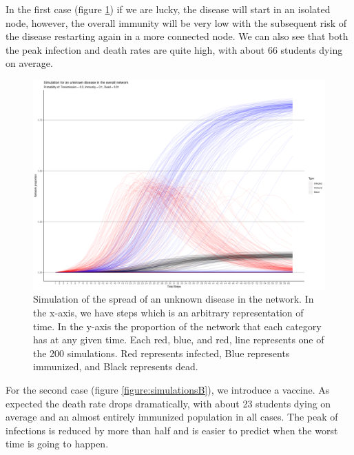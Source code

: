 \begin{table}[H]
    \label{table:networkSimulations}
    
\end{table}

In the first case (figure \ref{figure:simulationsA}) if we are lucky, the disease will start in an isolated node, however, the overall immunity will be very low with the subsequent risk of the disease restarting again in a more connected node. We can also see that both the peak infection and death rates are quite high, with about 66 students dying on average.

    \begin{figure}[h!]
        \centering
            \includegraphics[width=0.95\linewidth]{figures/Networks/Simulations/Simulation_Nothing.png} 
        \caption{Simulation of the spread of an unknown disease in the network. In the x-axis, we have steps which is an arbitrary representation of time. In the y-axis the proportion of the network that each category has at any given time. Each red, blue, and red, line represents one of the 200 simulations. Red represents infected, Blue represents immunized, and Black represents dead.}
        \label{figure:simulationsA}
    \end{figure}   


For the second case (figure \ref{figure:simulationsB}), we introduce a vaccine. As expected the death rate drops dramatically, with about 23 students dying on average and an almost entirely immunized population in all cases. The peak of infections is reduced by more than half and is easier to predict when the worst time is going to happen.

